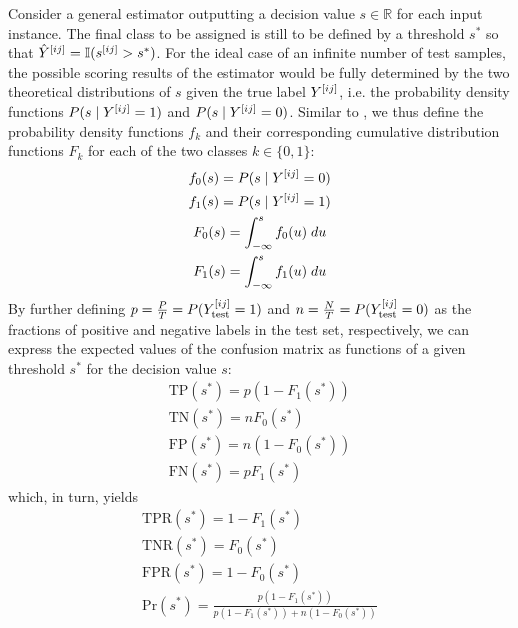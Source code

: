 Consider a general estimator outputting a decision value $s \in \mathbb{R}$ for each input instance. The final class to be assigned is still to be defined by a threshold $s^*$ so that $\hat Y^{[ij]} = \mathbb{I}(s^{[ij]} > s^*)$. For the ideal case of an infinite number of test samples, the possible scoring results of the estimator would be fully determined by the two theoretical distributions of $s$ given the true label $Y^{[ij]}$, i.e. the probability density functions $P(s \mid Y^{[ij]} = 1)$ and $P(s \mid Y^{[ij]} = 0)$. Similar to \textcite{hand2009measuring}, we thus define the probability density functions $f_k$ and their corresponding cumulative distribution functions $F_k$ for each of the two classes $k \in \{0, 1\}$:
%
\begin{gather}
    f_0(s) = P(s \mid Y^{[ij]} = 0) \\
    f_1(s) = P(s \mid Y^{[ij]} = 1) \\
    F_0(s) = \int_{-\infty}^s f_0(u)\;du \\
    F_1(s) = \int_{-\infty}^s f_1(u)\;du
    \label{eq:ideal_confusion_matrix}
\end{gather}
%
By further defining $p=\frac{P}{T}=P(Y_\text{test}^{[ij]}=1)$ and $n=\frac{N}{T}=P(Y_\text{test}^{[ij]}=0)$ as the fractions of positive and negative labels in the test set, respectively, we can express the expected values of the confusion matrix as functions of a given threshold $s^*$ for the decision value $s$:
%
\begin{gather}
    \text{TP}(s^*) = p (1 - F_1(s^*)) \\
    \text{TN}(s^*) = n F_0(s^*) \\
    \text{FP}(s^*) = n (1 - F_0(s^*)) \\
    \text{FN}(s^*) = p F_1(s^*)
\end{gather}
%
which, in turn, yields
%
\begin{gather}
    \text{TPR}(s^*) = 1 - F_1(s^*) \\
    \text{TNR}(s^*) = F_0(s^*) \\
    \text{FPR}(s^*) = 1 - F_0(s^*) \\
    \text{Pr}(s^*) = \frac{p (1 - F_1(s^*))}{p (1 - F_1(s^*)) + n (1 - F_0(s^*))}
\end{gather}

